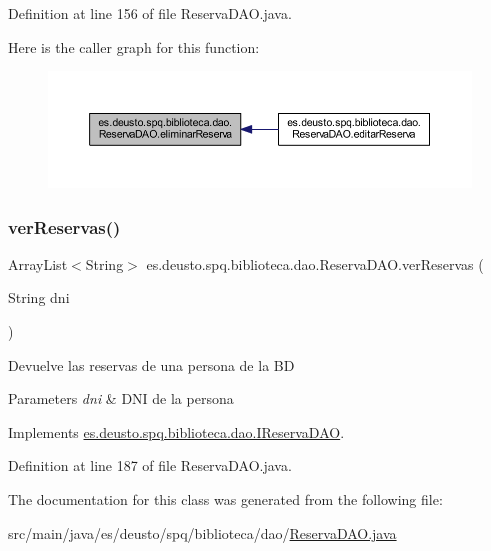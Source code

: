 Definition at line 156 of file Reserva\+D\+A\+O.\+java.

Here is the caller graph for this function\+:
\nopagebreak
\begin{figure}[H]
\begin{center}
\leavevmode
\includegraphics[width=350pt]{classes_1_1deusto_1_1spq_1_1biblioteca_1_1dao_1_1_reserva_d_a_o_a82fb1dbc3f6715103dea1b3bfb3d66b0_icgraph}
\end{center}
\end{figure}
\mbox{\label{classes_1_1deusto_1_1spq_1_1biblioteca_1_1dao_1_1_reserva_d_a_o_a553798fbb62f35db87554e0b431f527b}} 
\subsubsection{\texorpdfstring{ver\+Reservas()}{verReservas()}}
{\footnotesize\ttfamily Array\+List$<$String$>$ es.\+deusto.\+spq.\+biblioteca.\+dao.\+Reserva\+D\+A\+O.\+ver\+Reservas (\begin{DoxyParamCaption}\item[{String}]{dni }\end{DoxyParamCaption})}

Devuelve las reservas de una persona de la BD 
\begin{DoxyParams}{Parameters}
{\em dni} & D\+NI de la persona \\
\hline
\end{DoxyParams}


Implements \mbox{\hyperlink{interfacees_1_1deusto_1_1spq_1_1biblioteca_1_1dao_1_1_i_reserva_d_a_o_aab8b6916e33fd28d632bab5fe2f1801c}{es.\+deusto.\+spq.\+biblioteca.\+dao.\+I\+Reserva\+D\+AO}}.



Definition at line 187 of file Reserva\+D\+A\+O.\+java.



The documentation for this class was generated from the following file\+:\begin{DoxyCompactItemize}
\item 
src/main/java/es/deusto/spq/biblioteca/dao/\mbox{\hyperlink{_reserva_d_a_o_8java}{Reserva\+D\+A\+O.\+java}}\end{DoxyCompactItemize}
